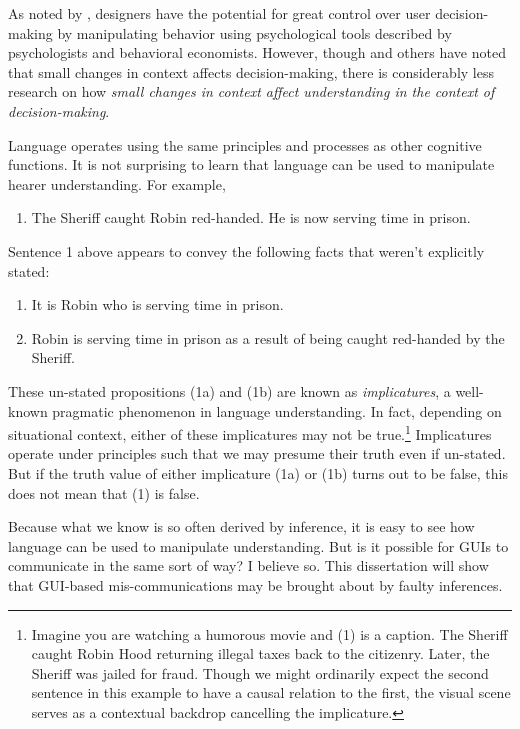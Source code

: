 As noted by  \cite*{Thaler:2010uy},  designers have the potential for great control over user decision-making by manipulating behavior using psychological tools described by psychologists and behavioral economists. However, though  \cite{Kahneman:1984td}  and others have noted that small changes in context affects decision-making, there is considerably less research on how \emph{small changes in context affect understanding in the context of decision-making}.

Language operates using the same principles and processes as other cognitive functions. It is not surprising to learn that language can be used to manipulate hearer understanding. For example,
 
\begin{enumerate} 
\item[(1)] The Sheriff caught Robin red-handed. He is now serving time in prison.
\end{enumerate}

Sentence 1 above appears to convey the following facts that weren't explicitly stated:

\begin{enumerate} 
\item[(1a)] It is Robin who is serving time in prison.
\item[(1b)] Robin is serving time in prison as a result of being caught red-handed by the Sheriff.
\end{enumerate}

These un-stated propositions (1a) and (1b) are known as \emph{implicatures}, a well-known pragmatic phenomenon in language understanding. In fact, depending on situational context, either of these implicatures may not be  true.\footnote{Imagine you are watching a humorous movie and (1) is a caption. The Sheriff caught Robin Hood returning illegal taxes back to the citizenry. Later, the Sheriff was jailed for fraud. Though we might ordinarily expect the second sentence in this example to have a causal relation to the first, the visual scene serves as a contextual backdrop cancelling the implicature.}  Implicatures operate under principles such that we may presume their truth even if un-stated. But if the truth value of either implicature (1a) or (1b) turns out to be false, this does not mean that (1) is false.

Because what we know is so often derived by inference, it is easy to see how language can be used to manipulate understanding. But is it possible for GUIs to communicate in the same sort of way? I believe so. This dissertation will show that GUI-based mis-communications may be brought about by faulty inferences.

